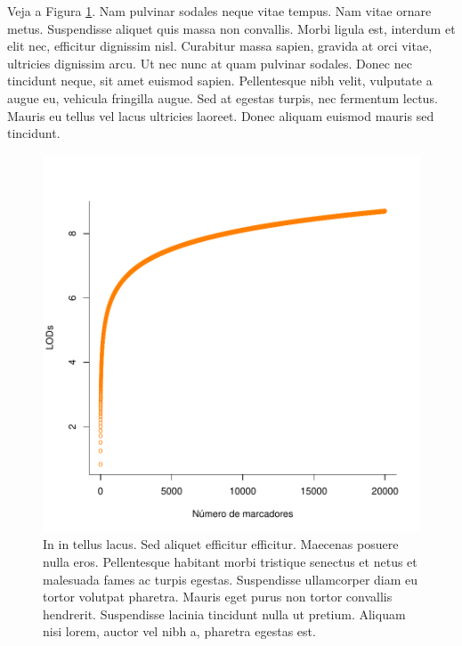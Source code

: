 \documentclass[book,A4paper,10pt,twoside,oldfontcommands]{memoir}\usepackage[]{graphicx}\usepackage[usenames,dvipsnames]{color}
\newenvironment{knitrout}{}{} %
\begin{document}
\begin{btUnit}
Veja a Figura \ref{fig:fig3}. Nam pulvinar sodales neque vitae tempus.
Nam vitae ornare metus. Suspendisse aliquet quis massa non convallis.
Morbi ligula est, interdum et elit nec, efficitur dignissim nisl.
Curabitur massa sapien, gravida at orci vitae, ultricies dignissim arcu.
Ut nec nunc at quam pulvinar sodales. Donec nec tincidunt neque, sit
amet euismod sapien. Pellentesque nibh velit, vulputate a augue eu,
vehicula fringilla augue. Sed at egestas turpis, nec fermentum lectus.
Mauris eu tellus vel lacus ultricies laoreet. Donec aliquam euismod
mauris sed tincidunt.


\begin{knitrout}
\color{fgcolor}\begin{figure}[htp]

{\centering \includegraphics[width=0.35\linewidth]{figuras/graphical_model} 

}

\caption[In in tellus lacus]{In in tellus lacus. Sed aliquet efficitur efficitur. Maecenas posuere nulla eros. Pellentesque habitant morbi tristique senectus et netus et malesuada fames ac turpis egestas. Suspendisse ullamcorper diam eu tortor volutpat pharetra. Mauris eget purus non tortor convallis hendrerit. Suspendisse lacinia tincidunt nulla ut pretium. Aliquam nisi lorem, auctor vel nibh a, pharetra egestas est.}\label{fig:fig3}
\end{figure}



\end{knitrout}
\end{btUnit}
\end{document}
